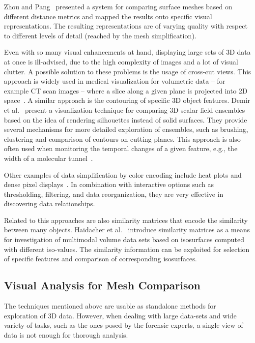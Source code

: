 \documentclass[final,5p,times]{elsarticle}
\begin{document}
Zhou and Pang~\cite{Zhou2001} presented a system for comparing surface meshes based on different distance metrics and mapped the results onto specific visual representations.
The resulting representations are of varying quality with respect to different levels of detail (reached by the mesh simplification).

Even with so many visual enhancements at hand, displaying large sets of 3D data at once is ill-advised, due to the high complexity of images and a lot of visual clutter. 
A possible solution to these problems is the usage of cross-cut views. 
This approach is widely used in medical visualization for volumetric data -- for example CT scan images -- where a slice along a given plane is projected into 2D space~\cite{friese2011yadiv}. 
A similar approach is the contouring of specific 3D object features.
Demir et al.~\cite{demir2016screen} present a visualization technique for
comparing 3D scalar field ensembles based on the idea of rendering silhouettes instead of solid surfaces.
They provide several mechanisms for more detailed exploration of ensembles, such as brushing, clustering and comparison of contours on cutting planes.
This approach is also often used when monitoring the temporal changes of a given feature, e.g., the width of a molecular tunnel~\cite{byska}.

Other examples of data simplification by color encoding include heat plots and dense pixel displays~\cite{byska,ivanisiev,zhai}. 
In combination with interactive options such as thresholding, filtering, and data reorganization, they are very effective in discovering data relationships.

Related to this approaches are also similarity matrices that encode the similarity between many objects. Haidacher et al.~\cite{haidacher2011volume} introduce similarity matrices as a means for investigation of multimodal volume data sets based on isosurfaces computed with different iso-values. The similarity information can be exploited for selection of specific features and comparison of corresponding isosurfaces.

\subsection{Visual Analysis for Mesh Comparison}
The techniques mentioned above are usable as standalone methods for exploration of 3D data.
However, when dealing with large data-sets and wide variety of tasks, such as the ones posed by the forensic experts, a single view of data is not enough for thorough analysis.
\end{document}
